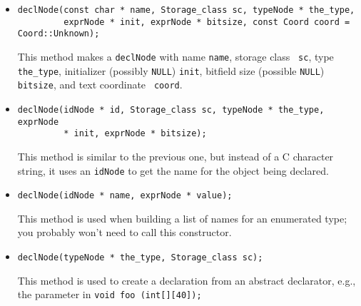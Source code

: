 \documentclass[10pt]{article}
\begin{document}
\begin{itemize}

\item

\begin{small}
\begin{verbatim}
declNode(const char * name, Storage_class sc, typeNode * the_type,
         exprNode * init, exprNode * bitsize, const Coord coord = Coord::Unknown);
\end{verbatim}
\end{small}

This method makes a {\tt declNode} with name {\tt name}, storage class {\tt
sc}, type {\tt the\_type}, initializer (possibly {\tt NULL}) {\tt init},
bitfield size (possible {\tt NULL}) {\tt bitsize}, and text coordinate {\tt
coord}.

\item

\begin{small}
\begin{verbatim}
declNode(idNode * id, Storage_class sc, typeNode * the_type, exprNode
         * init, exprNode * bitsize); 
\end{verbatim}
\end{small}

This method is similar to the previous one, but instead of a C character
string, it uses an {\tt idNode} to get the name for the object being
declared.

\item

\begin{small}
\begin{verbatim}
declNode(idNode * name, exprNode * value);
\end{verbatim}
\end{small}

This method is used when building a list of names for an enumerated type; you
probably won't need to call this constructor.

\item

\begin{small}
\begin{verbatim}
declNode(typeNode * the_type, Storage_class sc); 
\end{verbatim}
\end{small}

This method is used to create a declaration from an abstract declarator,
e.g., the parameter in {\tt void foo (int[][40]); }

\end{itemize}
\end{document}

